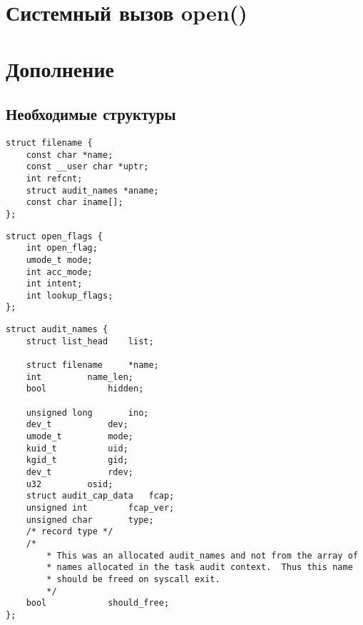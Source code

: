 \chapter*{Системный вызов open()}













\chapter*{Дополнение}

\section*{Необходимые структуры}

\begin{lstlisting}
struct filename {
    const char *name;
    const __user char *uptr;
    int refcnt;
    struct audit_names *aname;
    const char iname[];
};
\end{lstlisting}


\begin{lstlisting}
struct open_flags {
    int open_flag;
    umode_t mode;
    int acc_mode;
    int intent;
    int lookup_flags;
};
\end{lstlisting}


\begin{lstlisting}
struct audit_names {
    struct list_head	list;

    struct filename		*name;
    int			name_len;
    bool			hidden;

    unsigned long		ino;
    dev_t			dev;
    umode_t			mode;
    kuid_t			uid;
    kgid_t			gid;
    dev_t			rdev;
    u32			osid;
    struct audit_cap_data	fcap;
    unsigned int		fcap_ver;
    unsigned char		type;		
    /* record type */
    /*
        * This was an allocated audit_names and not from the array of
        * names allocated in the task audit context.  Thus this name
        * should be freed on syscall exit.
        */
    bool			should_free;
};
\end{lstlisting}


